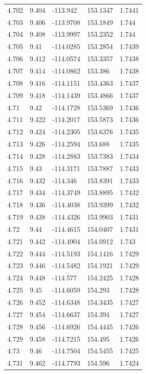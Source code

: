 \begin{tabular}{lllll}
4.702 & 9.404 & -113.942 & 153.1347 & 1.7441 \\
4.703 & 9.406 & -113.9708 & 153.1849 & 1.744 \\
4.704 & 9.408 & -113.9997 & 153.2352 & 1.744 \\
4.705 & 9.41 & -114.0285 & 153.2854 & 1.7439 \\
4.706 & 9.412 & -114.0574 & 153.3357 & 1.7438 \\
4.707 & 9.414 & -114.0862 & 153.386 & 1.7438 \\
4.708 & 9.416 & -114.1151 & 153.4363 & 1.7437 \\
4.709 & 9.418 & -114.1439 & 153.4866 & 1.7437 \\
4.71 & 9.42 & -114.1728 & 153.5369 & 1.7436 \\
4.711 & 9.422 & -114.2017 & 153.5873 & 1.7436 \\
4.712 & 9.424 & -114.2305 & 153.6376 & 1.7435 \\
4.713 & 9.426 & -114.2594 & 153.688 & 1.7435 \\
4.714 & 9.428 & -114.2883 & 153.7383 & 1.7434 \\
4.715 & 9.43 & -114.3171 & 153.7887 & 1.7433 \\
4.716 & 9.432 & -114.346 & 153.8391 & 1.7433 \\
4.717 & 9.434 & -114.3749 & 153.8895 & 1.7432 \\
4.718 & 9.436 & -114.4038 & 153.9399 & 1.7432 \\
4.719 & 9.438 & -114.4326 & 153.9903 & 1.7431 \\
4.72 & 9.44 & -114.4615 & 154.0407 & 1.7431 \\
4.721 & 9.442 & -114.4904 & 154.0912 & 1.743 \\
4.722 & 9.444 & -114.5193 & 154.1416 & 1.7429 \\
4.723 & 9.446 & -114.5482 & 154.1921 & 1.7429 \\
4.724 & 9.448 & -114.577 & 154.2425 & 1.7428 \\
4.725 & 9.45 & -114.6059 & 154.293 & 1.7428 \\
4.726 & 9.452 & -114.6348 & 154.3435 & 1.7427 \\
4.727 & 9.454 & -114.6637 & 154.394 & 1.7427 \\
4.728 & 9.456 & -114.6926 & 154.4445 & 1.7426 \\
4.729 & 9.458 & -114.7215 & 154.495 & 1.7426 \\
4.73 & 9.46 & -114.7504 & 154.5455 & 1.7425 \\
4.731 & 9.462 & -114.7793 & 154.596 & 1.7424 \\

\end{tabular}
